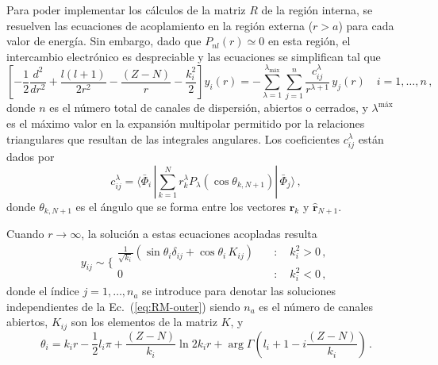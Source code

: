Para poder implementar los cálculos de la matriz $R$ de la región 
interna, se resuelven las ecuaciones de acoplamiento en la región 
externa ($r>a$) para cada valor de energía. Sin embargo, dado que 
$P_{nl}(r)\simeq 0$ en esta región, el intercambio electrónico es 
despreciable y las ecuaciones se simplifican tal que
\begin{equation}
\left[-\frac{1}{2}\frac{d^2}{dr^2}+\frac{l(l+1)}{2r^2}-\frac{(Z-N)}{r}
-\frac{k_i^2}{2}\right]y_i(r)=-\sum_{\lambda=1}^{\lambda_{\textrm{máx}}}
\sum_{j=1}^{n}\frac{c_{ij}^{\lambda}}{r^{\lambda+1}}\,y_j(r)
\quad i=1,\dots, n\,,
\label{eq:RM-outer}
\end{equation}
donde $n$ es el número total de canales de dispersión, abiertos o 
cerrados, y $\lambda^{\textrm{máx}}$ es el máximo valor en la expansión
multipolar permitido por la relaciones triangulares que resultan de las 
integrales angulares. Los coeficientes $c_{ij}^{\lambda}$ están dados 
por
\begin{equation}
c_{ij}^{\lambda}=\langle\bar{\Phi}_i\,|\sum_{k=1}^Nr_k^{\lambda}
P_{\lambda}\left(\cos\theta_{k,N+1}\right)|\,\bar{\Phi}_j\rangle\,,
\end{equation}
donde $\theta_{k,N+1}$ es el ángulo que se forma entre los vectores 
$\hat{\mathbf{r}}_{k}$ y $\hat{\mathbf{r}}_{N+1}$. 

Cuando $r\rightarrow\infty$, la solución a estas ecuaciones acopladas
resulta
\begin{equation}
y_{ij}\sim\bigg\{
\begin{array}{ll}
\frac{1}{\sqrt{k_i}}\left(\sin\theta_i\delta_{ij}
+\cos\theta_i\,K_{ij}\right) &\quad:\quad k_i^2>0\,,\\
0 &\quad:\quad k_i^2<0\,,
\end{array}
\end{equation}
donde el índice $j=1,\dots,n_a$ se introduce para denotar las soluciones 
independientes de la Ec.~(\ref{eq:RM-outer}) siendo $n_a$ es el número 
de canales abiertos, $K_{ij}$ son los elementos de la matriz $K$, y 
\begin{equation}
\theta_i=k_ir-\frac{1}{2}l_i\pi+\frac{(Z-N)}{k_i}\ln 2k_i r +\arg \Gamma
\left(l_i+1-i\frac{(Z-N)}{k_i}\right)\,.
\end{equation}

